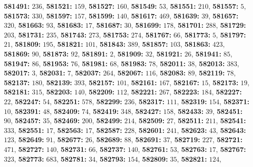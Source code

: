 \textsf{\bfseries 581491:} $236$, \textsf{\bfseries 581521:} $159$, \textsf{\bfseries 581527:} $160$, \textsf{\bfseries 581549:} $53$, \textsf{\bfseries 581551:} $210$, \textsf{\bfseries 581557:} $5$, \textsf{\bfseries 581573:} $330$, \textsf{\bfseries 581597:} $157$, \textsf{\bfseries 581599:} $140$, \textsf{\bfseries 581617:} $469$, \textsf{\bfseries 581639:} $39$, \textsf{\bfseries 581657:} $320$, \textsf{\bfseries 581663:} $93$, \textsf{\bfseries 581683:} $17$, \textsf{\bfseries 581687:} $30$, \textsf{\bfseries 581699:} $178$, \textsf{\bfseries 581701:} $288$, \textsf{\bfseries 581729:} $203$, \textsf{\bfseries 581731:} $235$, \textsf{\bfseries 581743:} $273$, \textsf{\bfseries 581753:} $274$, \textsf{\bfseries 581767:} $66$, \textsf{\bfseries 581773:} $5$, \textsf{\bfseries 581797:} $21$, \textsf{\bfseries 581809:} $195$, \textsf{\bfseries 581821:} $101$, \textsf{\bfseries 581843:} $389$, \textsf{\bfseries 581857:} $103$, \textsf{\bfseries 581863:} $423$, \textsf{\bfseries 581869:} $90$, \textsf{\bfseries 581873:} $92$, \textsf{\bfseries 581891:} $2$, \textsf{\bfseries 581909:} $32$, \textsf{\bfseries 581921:} $26$, \textsf{\bfseries 581941:} $85$, \textsf{\bfseries 581947:} $86$, \textsf{\bfseries 581953:} $76$, \textsf{\bfseries 581981:} $68$, \textsf{\bfseries 581983:} $78$, \textsf{\bfseries 582011:} $38$, \textsf{\bfseries 582013:} $383$, \textsf{\bfseries 582017:} $3$, \textsf{\bfseries 582031:} $7$, \textsf{\bfseries 582037:} $264$, \textsf{\bfseries 582067:} $116$, \textsf{\bfseries 582083:} $89$, \textsf{\bfseries 582119:} $78$, \textsf{\bfseries 582137:} $180$, \textsf{\bfseries 582139:} $393$, \textsf{\bfseries 582157:} $101$, \textsf{\bfseries 582161:} $167$, \textsf{\bfseries 582167:} $15$, \textsf{\bfseries 582173:} $19$, \textsf{\bfseries 582181:} $315$, \textsf{\bfseries 582203:} $140$, \textsf{\bfseries 582209:} $112$, \textsf{\bfseries 582221:} $267$, \textsf{\bfseries 582223:} $184$, \textsf{\bfseries 582227:} $22$, \textsf{\bfseries 582247:} $54$, \textsf{\bfseries 582251:} $578$, \textsf{\bfseries 582299:} $236$, \textsf{\bfseries 582317:} $111$, \textsf{\bfseries 582319:} $154$, \textsf{\bfseries 582371:} $10$, \textsf{\bfseries 582391:} $48$, \textsf{\bfseries 582409:} $74$, \textsf{\bfseries 582419:} $348$, \textsf{\bfseries 582427:} $158$, \textsf{\bfseries 582433:} $39$, \textsf{\bfseries 582451:} $90$, \textsf{\bfseries 582457:} $35$, \textsf{\bfseries 582469:} $200$, \textsf{\bfseries 582499:} $214$, \textsf{\bfseries 582509:} $27$, \textsf{\bfseries 582511:} $211$, \textsf{\bfseries 582541:} $333$, \textsf{\bfseries 582551:} $17$, \textsf{\bfseries 582563:} $17$, \textsf{\bfseries 582587:} $228$, \textsf{\bfseries 582601:} $241$, \textsf{\bfseries 582623:} $43$, \textsf{\bfseries 582643:} $123$, \textsf{\bfseries 582649:} $91$, \textsf{\bfseries 582677:} $26$, \textsf{\bfseries 582689:} $88$, \textsf{\bfseries 582691:} $37$, \textsf{\bfseries 582719:} $227$, \textsf{\bfseries 582721:} $471$, \textsf{\bfseries 582727:} $140$, \textsf{\bfseries 582731:} $66$, \textsf{\bfseries 582737:} $140$, \textsf{\bfseries 582761:} $53$, \textsf{\bfseries 582763:} $17$, \textsf{\bfseries 582767:} $323$, \textsf{\bfseries 582773:} $683$, \textsf{\bfseries 582781:} $34$, \textsf{\bfseries 582793:} $154$, \textsf{\bfseries 582809:} $35$, \textsf{\bfseries 582821:} $124$, 
